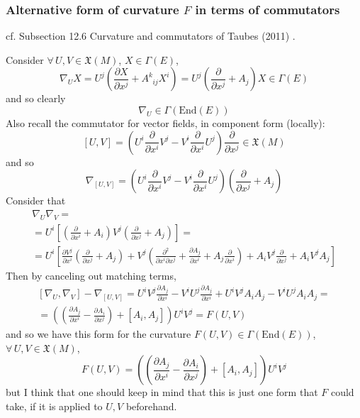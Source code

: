 \documentclass[10pt]{amsart}
\begin{document}
\begin{multicols}{2}
\subsubsection{Alternative form of curvature $F$ in terms of commutators}
cf. Subsection 12.6 Curvature and commutators of Taubes (2011) \cite{CTaubes2011}.  

Consider $\forall \, U,V \in \mathfrak{X}(M)$, $X\in \Gamma(E)$,
\[
\nabla_U X = U^j \left( \frac{ \partial X}{ \partial x^j} + A^k_{ \; \; ij} X^i \right) = U^j \left( \frac{ \partial }{ \partial x^j } + A_j \right) X \in \Gamma(E)
\]
and so clearly 
\[
\nabla_U \in \Gamma(\text{End}(E))
\]
Also recall the commutator for vector fields, in component form (locally):
\[
[U,V] = \left( U^i \frac{ \partial }{ \partial x^i} V^j -  V^i \frac{ \partial }{ \partial x^i} U^j \right) \frac{ \partial }{ \partial x^j} \in \mathfrak{X}(M)
\]
and so 
\[
\nabla_{[U,V]} = \left( U^i \frac{ \partial }{ \partial x^i } V^j - V^i \frac{ \partial }{ \partial x^i } U^j \right) \left( \frac{ \partial }{ \partial x^j } + A_j \right)
\]
Consider that 
\[
\begin{gathered}
\nabla_U \nabla_V = \\
 = U^i \left[ \left( \frac{ \partial }{ \partial x^i } + A_i \right) V^j \left( \frac{ \partial }{ \partial x^j} + A_j \right) \right] = \\
  = U^i \left[  \frac{ \partial V^j}{ \partial x^i} \left( \frac{ \partial }{ \partial x^j} + A_j \right) + V^j \left( \frac{ \partial^2}{ \partial x^i \partial x^j } + \frac{ \partial A_j }{ \partial x^i } + A_j \frac{ \partial }{ \partial x^i } \right) + A_i V^j \frac{ \partial }{ \partial x^j} + A_i V^j A_j \right]
\end{gathered}
\]
Then by canceling out matching terms, 
\[
\begin{gathered}
  [ \nabla_U, \nabla_V ] - \nabla_{[U,V] } = U^i V^j \frac{ \partial A_j}{ \partial x^i} - V^i U^j \frac{ \partial A_j}{ \partial x^i} + U^i V^j A_i A_j - V^i U^j A_i A_j = \\
  = \left( \left( \frac{ \partial A_j }{ \partial x^i } - \frac{ \partial A_i}{ \partial x^j} \right) + [A_i, A_j] \right) U^i V^j = F(U,V)
\end{gathered}
\]
and so we have this form for the curvature $F(U,V) \in \Gamma(\text{End}(E))$, $\forall \, U,V \in \mathfrak{X}(M)$, 
\[
F(U,V) = \left( \left( \frac{ \partial A_j}{ \partial x^i } - \frac{ \partial A_i}{ \partial x^j } \right) + [A_i,A_j] \right)U^i V^j
\]
but I think that one should keep in mind that this is just one form that $F$ could take, if it is applied to $U,V$ beforehand.  


\end{multicols}
\end{document}
